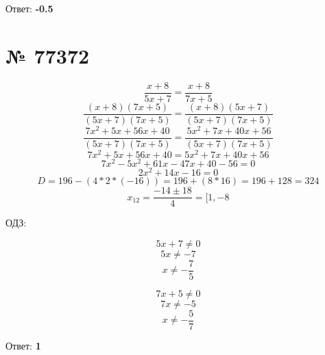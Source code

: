\documentclass[11pt]{article} %
\begin{document}
Ответ: \textbf{-0.5}

\section{№ \textbf{77372}}

$$\frac{x + 8}{5x + 7} = \frac{x + 8}{7x + 5}$$
$$\frac{(x+8)(7x+5)}{(5x + 7)(7x + 5)} = \frac{(x+8)(5x + 7)}{(5x + 7)(7x + 5)}$$
$$\frac{7x^2 + 5x + 56x + 40}{(5x+7)(7x+5)} = \frac{5x^2 + 7x + 40x + 56}{(5x+7)(7x+5)}$$
$$7x^2 + 5x + 56x + 40 = 5x^2 + 7x + 40x + 56$$
$$ 7x^2 - 5x^2 + 61x - 47x + 40 - 56 = 0 $$
$$ 2x^2 + 14x - 16 = 0 $$
$$ D = 196 - (4 * 2 * (-16)) = 196 + (8 * 16) = 196 + 128 = 324 $$
$$ x_{12} = \frac{-14 \pm 18}{4} = [1, -8$$

ОДЗ:

$$5x + 7 \neq 0 $$
$$5x \neq -7$$
$$x \neq -\frac{7}{5}$$


$$7x + 5 \neq 0 $$
$$7x \neq -5 $$
$$x \neq -\frac{5}{7}$$

Ответ: \textbf{1}
\end{document}
